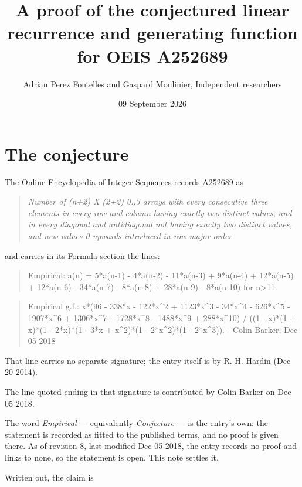 \documentclass[11pt]{article}
\title{A proof of the conjectured linear recurrence and generating function for OEIS A252689}
\author{Adrian Perez Fontelles and Gaspard Moulinier, Independent researchers}
\date{09 September 2026}
\theoremstyle{definition}
\begin{document}
\maketitle
\section{The conjecture}

The Online Encyclopedia of Integer Sequences records \href{https://oeis.org/A252689}{A252689} as

\begin{quote}\itshape Number of (n+2) X (2+2) 0..3 arrays with every consecutive three elements in every row and column having exactly two distinct values, and in every diagonal and antidiagonal not having exactly two distinct values, and new values 0 upwards introduced in row major order\end{quote}

and carries in its Formula section the lines:

\begin{quote}\ttfamily Empirical: a(n) = 5*a(n-1) - 4*a(n-2) - 11*a(n-3) + 9*a(n-4) + 12*a(n-5) + 12*a(n-6) - 34*a(n-7) - 8*a(n-8) + 28*a(n-9) - 8*a(n-10) for n>11.\end{quote}

\begin{quote}\ttfamily Empirical g.f.: x*(96 - 338*x - 122*x\textasciicircum{}2 + 1123*x\textasciicircum{}3 - 34*x\textasciicircum{}4 - 626*x\textasciicircum{}5 - 1907*x\textasciicircum{}6 + 1306*x\textasciicircum{}7+ 1728*x\textasciicircum{}8 - 1488*x\textasciicircum{}9 + 288*x\textasciicircum{}10) / ((1 - x)*(1 + x)*(1 - 2*x)*(1 - 3*x + x\textasciicircum{}2)*(1 - 2*x\textasciicircum{}2)*(1 - 2*x\textasciicircum{}3)). - Colin Barker, Dec 05 2018\end{quote}

That line carries no separate signature; the entry itself is by R. H. Hardin (Dec 20 2014).

The line quoted ending in that signature is contributed by Colin Barker on Dec 05 2018.

The word {\itshape Empirical} --- equivalently {\itshape Conjecture} --- is the entry's own: the statement is recorded as fitted to the published terms, and no proof is given there. As of revision 8, last modified Dec 05 2018, the entry records no proof and links to none, so the statement is open. This note settles it.

Written out, the claim is
\end{document}
